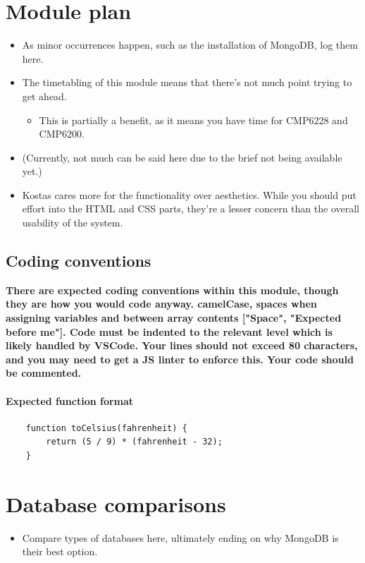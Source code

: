 \documentclass[12pt]{report}
\begin{document}
\chapter*{Module plan}
\begin{itemize}
    \item As minor occurrences happen, such as the installation of MongoDB, log them here.
    \item The timetabling of this module means that there's not much point trying to get ahead.
    \begin{itemize}
        \item This is partially a benefit, as it means you have time for CMP6228 and CMP6200.
    \end{itemize}
    \item (Currently, not much can be said here due to the brief not being available yet.)
    \item Kostas cares more for the functionality over aesthetics. While you should put effort into 
    the HTML and CSS parts, they're a lesser concern than the overall usability of the system.
\end{itemize}

\section*{Coding conventions}

\textbf{There are expected coding conventions within this module, though they are how you would 
code anyway. camelCase, spaces when assigning variables and between array contents ["Space", "Expected before me"].
Code must be indented to the relevant level which is likely handled by VSCode. Your lines should not exceed 
80 characters, and you may need to get a JS linter to enforce this. Your code should be commented.}

\vspace{10pt}

\subsubsection{Expected function format}

\begin{verbatim}
    function toCelsius(fahrenheit) {
        return (5 / 9) * (fahrenheit - 32);
    }
\end{verbatim}

\chapter{Database comparisons}
\begin{itemize}
    \item Compare types of databases here, ultimately ending on why MongoDB 
    is their best option.
\end{itemize}
\end{document}
